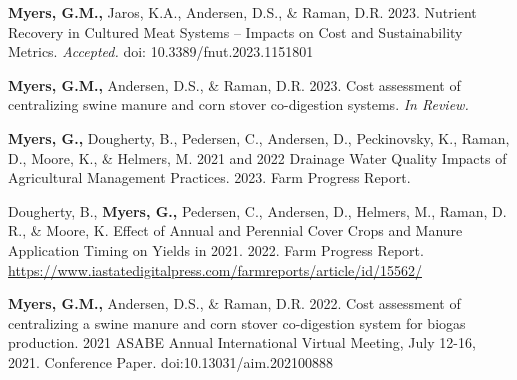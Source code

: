 




\begin{cvparagraph}

   
   \textbf{Myers, G.M., }Jaros, K.A., Andersen, D.S.,  \& Raman, D.R. 2023. Nutrient Recovery in Cultured Meat Systems – Impacts on Cost and Sustainability Metrics. \textit{Accepted.} doi: 10.3389/fnut.2023.1151801
   
   \textbf{Myers, G.M., }Andersen, D.S.,  \& Raman, D.R. 2023. Cost assessment of centralizing swine manure and corn stover co-digestion systems. \textit{In Review.}


   \textbf{Myers, G., }Dougherty, B., Pedersen, C., Andersen, D., Peckinovsky, K., Raman, D., Moore, K., \& Helmers, M. 2021 and 2022 Drainage Water Quality Impacts of Agricultural Management Practices. 2023. Farm Progress Report. 

   Dougherty, B., \textbf{Myers, G., }Pedersen, C., Andersen, D., Helmers, M., Raman, D. R., \&  Moore, K. Effect of Annual and Perennial Cover Crops and Manure Application Timing on Yields in 2021. 2022. Farm Progress Report. \url{https://www.iastatedigitalpress.com/farmreports/article/id/15562/}


   \textbf{Myers, G.M., }Andersen, D.S.,  \& Raman, D.R. 2022. Cost assessment of centralizing a swine manure and corn stover co-digestion system for biogas production. 2021 ASABE Annual International Virtual Meeting, July 12-16, 2021. Conference Paper. doi:10.13031/aim.202100888


\end{cvparagraph}
